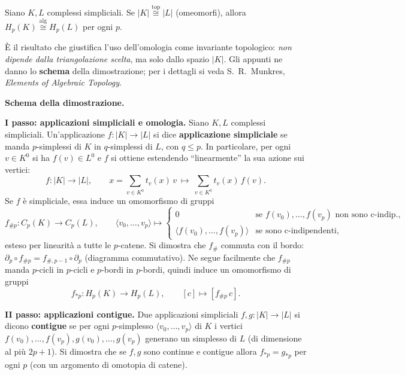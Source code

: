 \begin{teo}
Siano $K, L$ complessi simpliciali. Se $|K| \overset{\text{top}}{\cong} |L|$ (omeomorfi), allora $H_p(K) \overset{\text{alg}}{\cong} H_p(L)$ per ogni $p$.
\end{teo}

\begin{observacion}
\`E il risultato che giustifica l'uso dell'omologia come invariante topologico: \emph{non dipende dalla triangolazione scelta}, ma solo dallo spazio $|K|$. Gli appunti ne danno lo \textbf{schema} della dimostrazione; per i dettagli si veda S.~R.~Munkres, \emph{Elements of Algebraic Topology}.
\end{observacion}

\textbf{Schema della dimostrazione.}

\medskip
\textbf{I passo: applicazioni simpliciali e omologia.} Siano $K, L$ complessi simpliciali. Un'applicazione $f: |K| \to |L|$ si dice \textbf{applicazione simpliciale} se manda $p$-simplessi di $K$ in $q$-simplessi di $L$, con $q \leqslant p$. In particolare, per ogni $v \in K^0$ si ha $f(v) \in L^0$ e $f$ si ottiene estendendo ``linearmente'' la sua azione sui vertici:
\[
f: |K| \to |L|, \qquad x = \sum_{v \in K^0} t_v(x)\, v \ \longmapsto\ \sum_{v \in K^0} t_v(x)\, f(v) .
\]
Se $f$ \`e simpliciale, essa induce un omomorfismo di gruppi
\[
f_{\#p}: C_p(K) \to C_p(L), \qquad \langle v_0, \dots, v_p \rangle \longmapsto \begin{cases} 0 & \text{se } f(v_0), \dots, f(v_p) \text{ non sono c-indip.,} \\ \langle f(v_0), \dots, f(v_p) \rangle & \text{se sono c-indipendenti,} \end{cases}
\]
esteso per linearit\`a a tutte le $p$-catene. Si dimostra che $f_\#$ commuta con il bordo: $\partial_p \circ f_{\#p} = f_{\#, p-1} \circ \partial_p$ (diagramma commutativo). Ne segue facilmente che $f_{\#p}$ manda $p$-cicli in $p$-cicli e $p$-bordi in $p$-bordi, quindi induce un omomorfismo di gruppi
\[
f_{*p}: H_p(K) \to H_p(L), \qquad [c] \longmapsto [f_{\#p}\, c] .
\]

\textbf{II passo: applicazioni contigue.} Due applicazioni simpliciali $f, g: |K| \to |L|$ si dicono \textbf{contigue} se per ogni $p$-simplesso $\langle v_0, \dots, v_p \rangle$ di $K$ i vertici $f(v_0), \dots, f(v_p), g(v_0), \dots, g(v_p)$ generano un simplesso di $L$ (di dimensione al pi\`u $2p+1$). Si dimostra che se $f, g$ sono continue e contigue allora $f_{*p} = g_{*p}$ per ogni $p$ (con un argomento di omotopia di catene).

